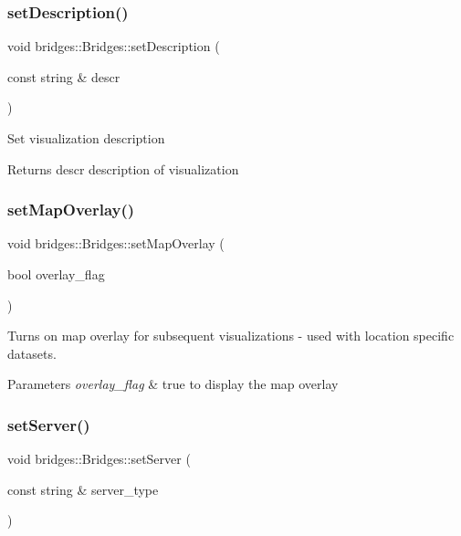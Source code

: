 \subsubsection{\texorpdfstring{setDescription()}{setDescription()}}
{\footnotesize\ttfamily void bridges\+::\+Bridges\+::set\+Description (\begin{DoxyParamCaption}\item[{const string \&}]{descr }\end{DoxyParamCaption})\hspace{0.3cm}{\ttfamily [inline]}}

Set visualization description \begin{DoxyReturn}{Returns}
descr description of visualization 
\end{DoxyReturn}
\mbox{\label{classbridges_1_1_bridges_a221442c674b625a403486076cf8a7c03}} 
\subsubsection{\texorpdfstring{setMapOverlay()}{setMapOverlay()}}
{\footnotesize\ttfamily void bridges\+::\+Bridges\+::set\+Map\+Overlay (\begin{DoxyParamCaption}\item[{bool}]{overlay\+\_\+flag }\end{DoxyParamCaption})\hspace{0.3cm}{\ttfamily [inline]}}



Turns on map overlay for subsequent visualizations -\/ used with location specific datasets. 


\begin{DoxyParams}{Parameters}
{\em overlay\+\_\+flag} & true to display the map overlay \\
\hline
\end{DoxyParams}
\mbox{\label{classbridges_1_1_bridges_afa05302cf91c91b902aef693525107a5}} 
\subsubsection{\texorpdfstring{setServer()}{setServer()}}
{\footnotesize\ttfamily void bridges\+::\+Bridges\+::set\+Server (\begin{DoxyParamCaption}\item[{const string \&}]{server\+\_\+type }\end{DoxyParamCaption})\hspace{0.3cm}{\ttfamily [inline]}}

